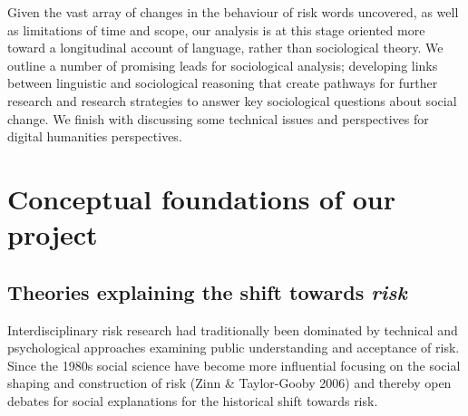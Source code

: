 Given the vast array of changes in the behaviour of risk words uncovered, as well as limitations of time and scope, our analysis is at this stage oriented more toward a longitudinal account of language, rather than sociological theory. We outline a number of promising leads for sociological analysis; developing links between linguistic and sociological reasoning that create pathways for further research and research strategies to answer key sociological questions about social change. We finish with discussing some technical issues and perspectives for digital humanities perspectives.

\chapter{Conceptual foundations of our project}

\section{Theories explaining the shift towards \emph{risk}}

Interdisciplinary risk research had traditionally been dominated by technical and psychological approaches examining public understanding and acceptance of risk. Since the 1980s social science have become more influential focusing on the social shaping and construction of risk (Zinn \& Taylor-Gooby 2006) and thereby open debates for social explanations for the historical shift towards risk. 

